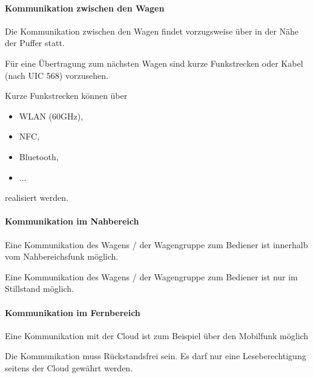\paragraph{Kommunikation zwischen den Wagen}
\begin{feat}
Die Kommunikation zwischen den Wagen findet vorzugsweise über in der Nähe der Puffer statt.
\end{feat}
\begin{feat}
Für eine Übertragung zum nächsten Wagen sind kurze Funkstrecken oder Kabel (nach UIC 568) vorzusehen.
\end{feat}
\begin{rem}[zu Anf. 35]
Kurze Funkstrecken können über
\begin{itemize}
    \item WLAN (60GHz),
    \item NFC,
    \item Bluetooth,
    \item ...
\end{itemize}
realisiert werden.
\end{rem}

\paragraph{Kommunikation im Nahbereich}
\begin{feat}
Eine Kommunikation des Wagens / der Wagengruppe zum Bediener ist innerhalb vom Nahbereichsfunk möglich.
\end{feat}
\begin{feat}
Eine Kommunikation des Wagens / der Wagengruppe zum Bediener ist nur im Stillstand möglich.
\end{feat}

\paragraph{Kommunikation im Fernbereich}
\begin{feat}
Eine Kommunikation mit der Cloud ist zum Beispiel über den Mobilfunk möglich
\end{feat}
\begin{feat}
Die Kommunikation muss Rückstandsfrei sein. Es darf nur eine Leseberechtigung seitens der Cloud gewährt werden.
\end{feat}

